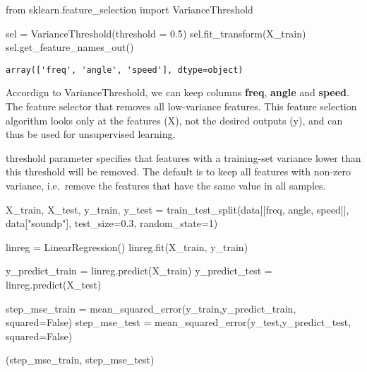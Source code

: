 \documentclass[
  letterpaper,
  DIV=11,
  numbers=noendperiod]{scrartcl}
\newenvironment{Shaded}{\begin{snugshade}}{\end{snugshade}}
\newcommand{\DecValTok}[1]{\textcolor[rgb]{0.68,0.00,0.00}{#1}}
\newcommand{\FloatTok}[1]{\textcolor[rgb]{0.68,0.00,0.00}{#1}}
\newcommand{\ImportTok}[1]{\textcolor[rgb]{0.00,0.46,0.62}{#1}}
\newcommand{\NormalTok}[1]{\textcolor[rgb]{0.00,0.23,0.31}{#1}}
\newcommand{\OperatorTok}[1]{\textcolor[rgb]{0.37,0.37,0.37}{#1}}
\newcommand{\StringTok}[1]{\textcolor[rgb]{0.13,0.47,0.30}{#1}}
\newcommand{\VariableTok}[1]{\textcolor[rgb]{0.07,0.07,0.07}{#1}}
\begin{document}
\begin{Shaded}
\begin{Highlighting}[]
\ImportTok{from}\NormalTok{ sklearn.feature\_selection }\ImportTok{import}\NormalTok{ VarianceThreshold}

\NormalTok{sel }\OperatorTok{=}\NormalTok{ VarianceThreshold(threshold }\OperatorTok{=} \FloatTok{0.5}\NormalTok{)}
\NormalTok{sel.fit\_transform(X\_train)}
\NormalTok{sel.get\_feature\_names\_out()}
\end{Highlighting}
\end{Shaded}

\begin{verbatim}
array(['freq', 'angle', 'speed'], dtype=object)
\end{verbatim}

Accordign to VarianceThreshold, we can keep columns \textbf{freq},
\textbf{angle} and \textbf{speed}. The feature selector that removes all
low-variance features. This feature selection algorithm looks only at
the features (X), not the desired outputs (y), and can thus be used for
unsupervised learning.

threshold parameter specifies that features with a training-set variance
lower than this threshold will be removed. The default is to keep all
features with non-zero variance, i.e.~remove the features that have the
same value in all samples.

\begin{Shaded}
\begin{Highlighting}[]
\NormalTok{X\_train, X\_test, y\_train, y\_test }\OperatorTok{=}\NormalTok{ train\_test\_split(data[[}\StringTok{\textquotesingle{}freq\textquotesingle{}}\NormalTok{, }\StringTok{\textquotesingle{}angle\textquotesingle{}}\NormalTok{, }\StringTok{\textquotesingle{}speed\textquotesingle{}}\NormalTok{]],}
\NormalTok{                                                    data[}\StringTok{"soundp"}\NormalTok{],}
\NormalTok{                                                    test\_size}\OperatorTok{=}\FloatTok{0.3}\NormalTok{, random\_state}\OperatorTok{=}\DecValTok{1}\NormalTok{)}

\NormalTok{linreg }\OperatorTok{=}\NormalTok{ LinearRegression()}
\NormalTok{linreg.fit(X\_train, y\_train)}

\NormalTok{y\_predict\_train }\OperatorTok{=}\NormalTok{ linreg.predict(X\_train)}
\NormalTok{y\_predict\_test }\OperatorTok{=}\NormalTok{ linreg.predict(X\_test)}

\NormalTok{step\_mse\_train }\OperatorTok{=}\NormalTok{ mean\_squared\_error(y\_train,y\_predict\_train, squared}\OperatorTok{=}\VariableTok{False}\NormalTok{)}
\NormalTok{step\_mse\_test }\OperatorTok{=}\NormalTok{ mean\_squared\_error(y\_test,y\_predict\_test, squared}\OperatorTok{=}\VariableTok{False}\NormalTok{)}

\NormalTok{(step\_mse\_train, step\_mse\_test)}
\end{Highlighting}
\end{Shaded}
\end{document}
